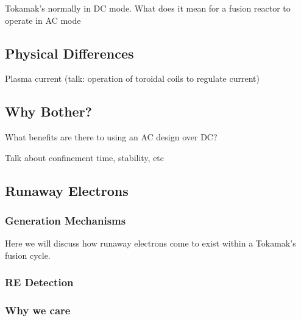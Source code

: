 Tokamak's normally in DC mode. What does it mean for a fusion reactor 
to operate in AC mode

\subsection{Physical Differences}

Plasma current (talk: operation of toroidal coils to regulate current)



\subsection{Why Bother?}

What benefits are there to using an AC design over DC?

Talk about confinement time, stability, etc

\subsection{Runaway Electrons}

\subsubsection{Generation Mechanisms}

Here we will discuss how runaway electrons come to exist within a Tokamak's fusion cycle.

\subsubsection{RE Detection}

\subsubsection{Why we care}

